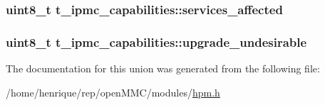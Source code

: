 \hypertarget{uniont__ipmc__capabilities_af022ead658150c3cb0af1d8d1cc52a4f}{
\subsubsection[{services\-\_\-affected}]{\setlength{\rightskip}{0pt plus 5cm}uint8\-\_\-t t\-\_\-ipmc\-\_\-capabilities\-::services\-\_\-affected}}\label{uniont__ipmc__capabilities_af022ead658150c3cb0af1d8d1cc52a4f}
\hypertarget{uniont__ipmc__capabilities_aaffb694baa0cba6b396e8a59bb82c4a6}{
\subsubsection[{upgrade\-\_\-undesirable}]{\setlength{\rightskip}{0pt plus 5cm}uint8\-\_\-t t\-\_\-ipmc\-\_\-capabilities\-::upgrade\-\_\-undesirable}}\label{uniont__ipmc__capabilities_aaffb694baa0cba6b396e8a59bb82c4a6}


The documentation for this union was generated from the following file\-:\begin{DoxyCompactItemize}
\item 
/home/henrique/rep/open\-M\-M\-C/modules/\hyperlink{hpm_8h}{hpm.\-h}\end{DoxyCompactItemize}
